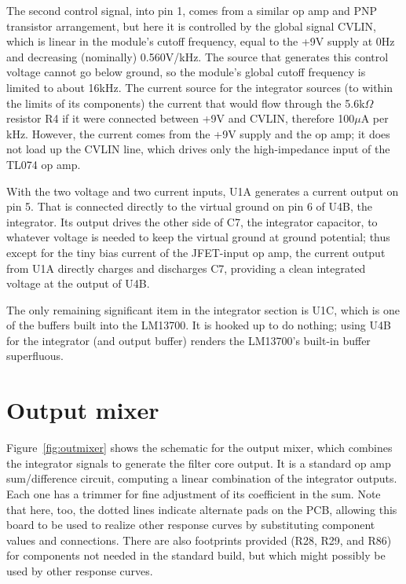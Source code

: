 The second control signal, into pin 1, comes from a similar op amp and PNP
transistor arrangement, but here it is controlled by the global signal
CVLIN, which is linear in the module's cutoff frequency, equal to the +9V
supply at 0Hz and decreasing (nominally) 0.560V/kHz.  The source that
generates this control voltage cannot go below ground, so the module's
global cutoff frequency is limited to about 16kHz.  The current source for
the integrator sources (to within the limits of its components) the current
that would flow through the 5.6k$\Omega$ resistor R4 if it were connected
between +9V and CVLIN, therefore 100$\mu$A per kHz.  However, the current
comes from the +9V supply and the op amp; it does not load up the CVLIN
line, which drives only the high-impedance input of the TL074 op amp.

With the two voltage and two current inputs, U1A generates a current output
on pin 5.  That is connected directly to the virtual ground on pin 6 of U4B,
the integrator.  Its output drives the other side of C7, the integrator
capacitor, to whatever voltage is needed to keep the virtual ground at
ground potential; thus except for the tiny bias current of the JFET-input op
amp, the current output from U1A directly charges and discharges C7,
providing a clean integrated voltage at the output of U4B.

The only remaining significant item in the integrator section is U1C, which
is one of the buffers built into the LM13700.  It is hooked up to do
nothing; using U4B for the integrator (and output buffer) renders the
LM13700's built-in buffer superfluous.


\section{Output mixer}

Figure~\ref{fig:outmixer} shows the schematic for the output mixer, which
combines the integrator signals to generate the filter core output.  It is a
standard op amp sum/difference circuit, computing a linear combination of
the integrator outputs.  Each one has a trimmer for fine adjustment of its
coefficient in the sum.  Note that here, too, the dotted lines indicate
alternate pads on the PCB, allowing this board to be used to realize other
response curves by substituting component values and connections.  There are
also footprints provided (R28, R29, and R86) for components not needed in
the standard build, but which might possibly be used by other response
curves.

